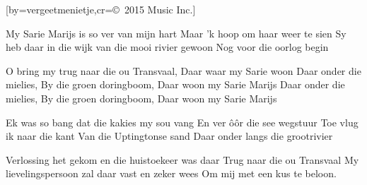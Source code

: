 

[by=vergeetmenietje,cr={\copyright~2015 Music Inc.}]




\beginverse
My Sarie Marijs is so ver van mijn hart
Maar 'k hoop om haar weer te sien
Sy heb daar in die wijk
van die mooi rivier gewoon
Nog voor die oorlog begin
\endverse

\beginchorus
O bring my trug naar die ou Transvaal, \brk  Daar waar my Sarie woon
Daar onder die mielies, \brk  By die groen doringboom, \brk  Daar woon my Sarie Marijs
Daar onder die mielies, \brk  By die groen doringboom, \brk  Daar woon my Sarie Marijs
\endchorus

\beginverse
Ek was so bang dat die kakies my sou vang
En ver ôôr die see wegstuur
Toe vlug ik naar die kant
Van die Uptingtonse sand
Daar onder langs die grootrivier
\endverse

\beginverse
Verlossing het gekom en die huistoekeer was daar
Trug naar die ou Transvaal
My lievelingspersoon
zal daar vast en zeker wees
Om mij met een kus te beloon.
\endverse




\endsong
